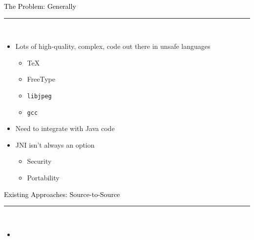 \documentclass[letter]{seminar}
\begin{document}
\begin{slide}\raggedright
\renewcommand{\leftmargini}{5mm}
{\Large{\textcolor{black}{The Problem: Generally}}}
\\\rule{\textwidth}{0.1pt}\\

\begin{itemize}


\item
     Lots of high-quality, complex, code out there in unsafe
      languages
\begin{itemize}


\item
         \TeX

\item
         FreeType

\item
         {\texttt{libjpeg}}

\item
         {\texttt{gcc}}
\end{itemize}


\item
     Need to integrate with Java code

\item
     JNI isn't always an option
\begin{itemize}


\item
         Security

\item
         Portability


\end{itemize}

\end{itemize}


\end{slide}


\begin{slide}\raggedright
\renewcommand{\leftmargini}{5mm}
{\Large{\textcolor{black}{Existing Approaches: Source-to-Source}}}
\\\rule{\textwidth}{0.1pt}\\

\begin{itemize}

\item \begin{figure}[H]
\begin{center}
\end{center}
\end{figure}

\end{itemize}


\end{slide}
\end{document}
